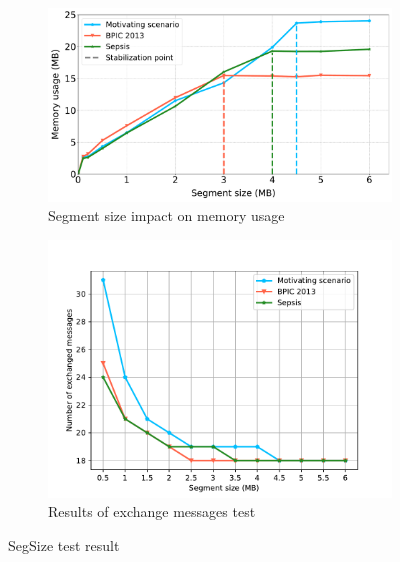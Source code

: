 \begin{figure}[t]
        \begin{subfigure}{0.49\textwidth}   
          \centering
          \includegraphics[width=\textwidth]{content/figures/memoryusage4-2.pdf}
          \caption{Segment size impact on memory usage}
          \label{snr_d}
        \end{subfigure}
	\begin{subfigure}{0.49\textwidth}   
		\centering
		\includegraphics[width=\textwidth]{src-j/content/figures/messagestest.pdf}
		\caption{Results of exchange messages test}
		\label{fig:messages_result}
	\end{subfigure}
	\caption{SegSize test result}
	\label{fig:segsizeresult}
\end{figure}


